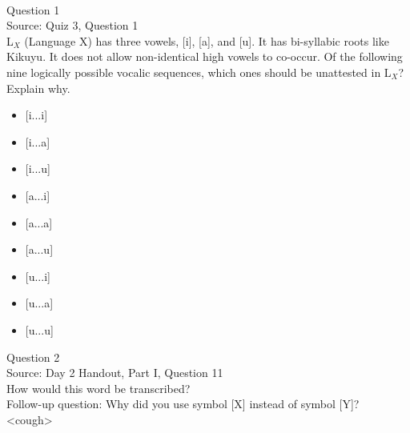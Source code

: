 \documentclass[12pt]{article}
\begin{document}
\begin{center}
\textbf{{\color{red}{\HUGE END OF EXAM}}}\\

\end{center}
\newpage

\begin{center}
\textbf{{\color{blue}{\HUGE START OF EXAM\\}}}

\textbf{{\color{blue}{\HUGE Student ID: 4656\\}}}

\textbf{{\color{blue}{\HUGE 2:00 - 2:15 PM\\}}}

\end{center}
\newpage

{\large Question 1}\\

Source: Quiz 3, Question 1\\

L$_X$ (Language X) has three vowels, [i], [a], and [u]. It has bi-syllabic roots like Kikuyu. It does not allow non-identical high vowels to co-occur. Of the following nine logically possible vocalic sequences, which ones should be unattested in L$_X$? Explain why.\\

\begin{itemize} \item {[i...i]} \item {[i...a]} \item {[i...u]} \item {[a...i]} \item {[a...a]} \item {[a...u]} \item {[u...i]} \item {[u...a]} \item {[u...u]} \end{itemize}


\newpage

{\large Question 2}\\

Source: Day 2 Handout, Part I, Question 11\\

How would this word be transcribed?\\ Follow-up question: Why did you use symbol [X] instead of symbol [Y]?\\

<cough>
\end{document}
